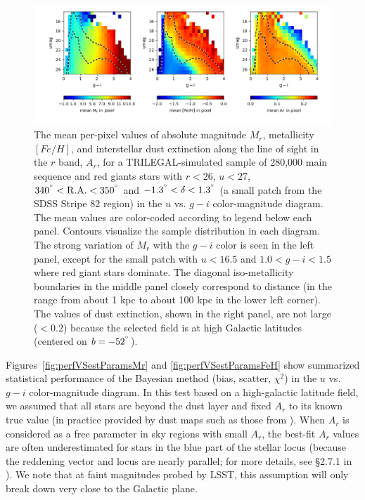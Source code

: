 \begin{figure}[ht!]
\hskip -0.3in
\includegraphics[width=1.08\textwidth,angle=0]{figures/qpBmeans_SDSSpatchRA340-350-simLSST_FeH.png}
\vskip -0.3in
\caption{The mean per-pixel values of absolute magnitude $M_r$, metallicity $[Fe/H]$, and interstellar dust extinction along the
  line of sight in the $r$ band, $A_r$, for a TRILEGAL-simulated sample of 280,000 main
  sequence and red giants stars with $r<26$, $u<27$, $340^{\degree} < {\rm R.A.} < 350^{\degree}$
  and $-1.3^{\degree} < \delta < 1.3^{\degree}$ (a small patch from the SDSS Stripe 82 region) in the $u$ vs. $g-i$
  color-magnitude diagram. The mean values are color-coded according to legend below each panel. Contours
  visualize the sample distribution in each diagram. The strong variation of $M_r$ with the $g-i$ color is seen in the left panel,
  except for the small patch with $u<16.5$ and $1.0 < g-i < 1.5$ where red giant stars dominate. The
  diagonal iso-metallicity boundaries in the middle panel closely correspond to distance
  (in the range from about 1 kpc to about 100 kpc in the lower left corner). The values of
  dust extinction, shown in the right panel, are not large ($<0.2$) because the
  selected field is at high Galactic latitudes (centered on $b = -52^{\degree}$).}
\label{fig:qpBmeans}
\end{figure}

Figures~\ref{fig:perfVSestParamsMr} and \ref{fig:perfVSestParamsFeH} show summarized statistical performance of the Bayesian
method (bias, scatter, $\chi^2$) in the $u$ vs. $g-i$ color-magnitude diagram. In this test based on a high-galactic
latitude field, we assumed that all stars are beyond the dust layer and fixed $A_r$ to its known true value (in practice provided by dust
maps such as those from \citealt{schlegel_maps_1998}). When $A_r$ is considered as a free parameter in sky regions with small $A_r$,
the best-fit $A_r$ values are often underestimated for stars in the blue part of the stellar locus (because the reddening vector and locus
are nearly parallel; for more details, see \S2.7.1 in \citealt{2012ApJ...757..166B}). We note that at faint magnitudes probed by LSST, this
assumption will only break down very close to the Galactic plane.


